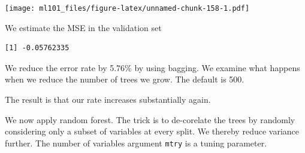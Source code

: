 \documentclass[]{article}
\newenvironment{Shaded}{\begin{snugshade}}{\end{snugshade}}
\newcommand{\CommentTok}[1]{\textcolor[rgb]{0.56,0.35,0.01}{\textit{#1}}}
\newcommand{\DataTypeTok}[1]{\textcolor[rgb]{0.13,0.29,0.53}{#1}}
\newcommand{\DecValTok}[1]{\textcolor[rgb]{0.00,0.00,0.81}{#1}}
\newcommand{\KeywordTok}[1]{\textcolor[rgb]{0.13,0.29,0.53}{\textbf{#1}}}
\newcommand{\NormalTok}[1]{#1}
\newcommand{\OperatorTok}[1]{\textcolor[rgb]{0.81,0.36,0.00}{\textbf{#1}}}
\newcommand{\OtherTok}[1]{\textcolor[rgb]{0.56,0.35,0.01}{#1}}
\newcommand{\StringTok}[1]{\textcolor[rgb]{0.31,0.60,0.02}{#1}}
\begin{document}
\texttt{[image: ml101\_files/figure-latex/unnamed-chunk-158-1.pdf]}

We estimate the MSE in the validation set

\begin{Shaded}
\end{Shaded}

\begin{verbatim}
[1] -0.05762335
\end{verbatim}

We reduce the error rate by 5.76\(\%\) by using bagging. We examine what happens when we reduce the number of trees we grow. The default is 500.

\begin{Shaded}
\end{Shaded}

The result is that our rate increases substantially again.

We now apply random forest. The trick is to de-corelate the trees by randomly considering only a subset of variables at every split. We thereby reduce variance further. The number of variables argument \texttt{mtry} is a tuning parameter.
\end{document}
